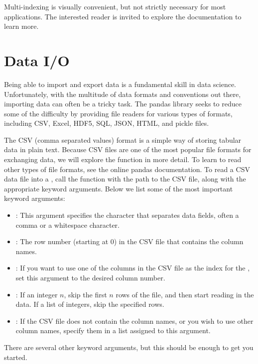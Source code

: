 Multi-indexing is visually convenient, but not strictly necessary for most applications.
The interested reader is invited to explore the documentation to learn more.

\section*{Data I/O}
Being able to import and export data is a fundamental skill in data science. Unfortunately, with the
multitude of data formats and conventions out there, importing data can often be a tricky task. The pandas library
seeks to reduce some of the difficulty by providing file readers for various types of formats, including
CSV, Excel, HDF5, SQL, JSON, HTML, and pickle files.

The CSV (comma separated values) format is a simple way of storing tabular data in plain text. Because CSV files are one of the most popular file formats for exchanging data, we will explore the
 function in more detail. To learn to read other types of file formats, see the online pandas documentation.
To read a CSV data file into a , call the  function with the path to the CSV file,
along with the appropriate keyword arguments. Below we list some of the most important keyword arguments:
\begin{itemize}
\item {}:
This argument specifies the character that separates data fields, often a comma or a whitespace character.

\item {}:
The row number (starting at 0) in the CSV file that contains the column names.

\item {}:
If you want to use one of the columns in the CSV file as the index for the ,
set this argument to the desired column number.

\item {}:
If an integer $n$, skip the first $n$ rows of the file, and then start reading in the data. If a list
of integers, skip the specified rows.

\item {}:
If the CSV file does not contain the column names, or you wish to use other column names, specify them
in a list assigned to this argument.

\end{itemize}
There are several other keyword arguments, but this should be enough to get you started.

